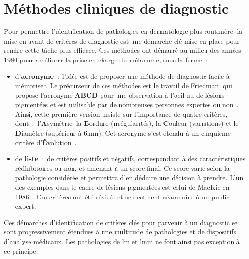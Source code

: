 \section{Méthodes cliniques de diagnostic}
\label{sec:clinical_methods}
Pour permettre l'identification de pathologies en dermatologie plus routinière, la mise en avant de critères de diagnostic est une démarche clé mise en place pour rendre cette tâche plus efficace. Ces méthodes ont démarré au milieu des années 1980 pour améliorer la prise en charge du mélanome, sous la forme~:
\begin{itemize}
    \item d'\textbf{acronyme}~:~l'idée est de proposer une méthode de diagnostic facile à mémoriser. Le précurseur de ces méthodes est le travail de Friedman, qui propose l'acronyme \textbf{ABCD} pour une observation à l'oeil nu de lésions pigmentées et est utilisable par de nombreuses personnes expertes ou non~\cite{Friedman1985}. Ainsi, cette première version insiste sur l'importance de quatre critères, dont~:~l'\textbf{A}symétrie, la \textbf{B}ordure (irrégularités), la \textbf{C}ouleur (variations) et le \textbf{D}iamètre (supérieur à 6mm). Cet acronyme s'est étendu à un cinquième critère d'\textbf{É}volution~\cite{Abbasi2004}.
    \item de \textbf{liste}~:~de critères positifs et négatifs, correspondant à des caractéristiques rédhibitoires ou non, et amenant à un score final. Ce score varie selon la pathologie considérée et permettra d'en déduire une décision à prendre. L'un des exemples dans le cadre de lésions pigmentées est celui de MacKie en 1986~\cite{mackie1986}. Ces critères ont été révisés et se destinent néanmoins à un public expert.
\end{itemize}\par

Ces démarches d'identification de critères clés pour parvenir à un diagnostic se sont progressivement étendues à une multitude de pathologies et de dispositifs d'analyse médicaux. Les pathologies de \gls{lm} et \gls{lmm} ne font ainsi pas exception à ce principe.\par

